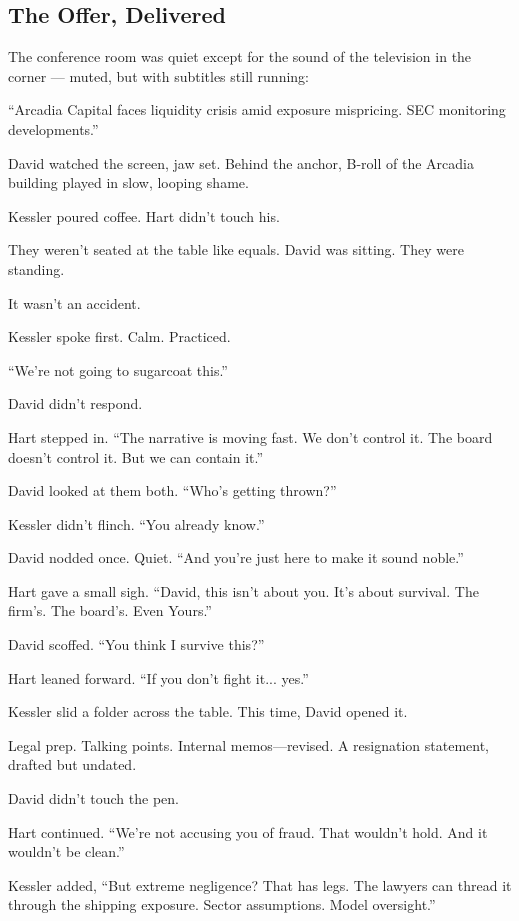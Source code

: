 
\subsection{The Offer, Delivered}

The conference room was quiet except for the sound of the television in the corner — muted, but with 
subtitles still running:

“Arcadia Capital faces liquidity crisis amid exposure mispricing. SEC monitoring developments.”

David watched the screen, jaw set. Behind the anchor, B-roll of the Arcadia building played in 
slow, looping shame.

Kessler poured coffee. Hart didn’t touch his.

They weren’t seated at the table like equals. David was sitting. They were standing.

It wasn’t an accident.

Kessler spoke first. Calm. Practiced.

“We’re not going to sugarcoat this.”

David didn’t respond.

Hart stepped in. “The narrative is moving fast. We don’t control it. The board doesn’t 
control it. But we can contain it.”

David looked at them both. “Who’s getting thrown?”

Kessler didn’t flinch. “You already know.”

David nodded once. Quiet. “And you’re just here to make it sound noble.”

Hart gave a small sigh. “David, this isn’t about you. It’s about survival. The firm’s. 
The board’s. Even Yours.”

David scoffed. “You think I survive this?”

Hart leaned forward. “If you don’t fight it... yes.”

Kessler slid a folder across the table. This time, David opened it.

Legal prep. Talking points. Internal memos—revised. A resignation statement, drafted but undated.

David didn’t touch the pen.

Hart continued. “We’re not accusing you of fraud. That wouldn’t hold. And it wouldn’t be clean.”

Kessler added, “But extreme negligence? That has legs. The lawyers can thread it through the 
shipping exposure. Sector assumptions. Model oversight.”

